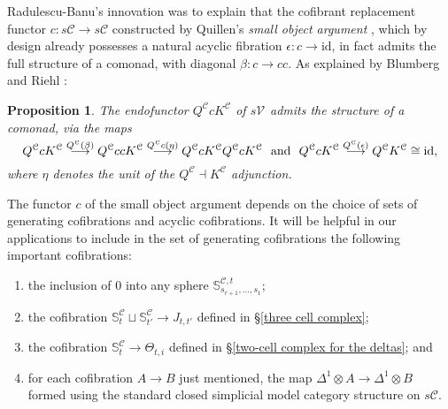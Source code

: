 \documentclass[11pt]{amsart} \renewcommand{\baselinestretch}{1.2}
\theoremstyle{plain}
\newtheorem{prop}[thm]{Proposition}
\numberwithin{equation}{section} %
\theoremstyle{plain}
\newtheorem{prop}[thm]{Proposition}
\numberwithin{equation}{chapter} %
\renewcommand{\to}{\longrightarrow}
\newcommand{\calV}{\mathcal{V}}
\newcommand{\calc}{\mathcal{C}}
\newcommand{\citeBOX}[2][]{\cite[\mbox{#1}]{#2}}
\newcommand{\vect}[2]{\calV^{#1}_{#2}}
\newcommand{\Id}{\mathrm{id}}
\begin{document}
\begin{Pi-algebras and cohomology algebras}
Radulescu-Banu's innovation \cite{Radulescu-Banu.pdf} was to explain that the cofibrant replacement functor $c:s\calc\to s\calc$ constructed by Quillen's \emph{small object argument}  \cite{QuillenHomAlg.pdf}, which by design already possesses a natural acyclic fibration $\epsilon:c\to\Id$, in fact admits the full structure of a comonad, with diagonal $\beta:c\to cc$. As explained by Blumberg and Riehl \cite[Remark 4.12]{BlumRiehlResolutions.pdf}:
\begin{prop}
\label{QcK is a comonad}
The endofunctor $Q^\calc cK^\calc$ of $s\vect{}{}$ admits the structure of a comonad, via the maps
\[Q^\calc cK^\calc\overset{\smash{Q^\calc (\beta)}}{\to}Q^\calc ccK^\calc \overset{\smash{Q^\calc c(\eta)}}{\to} Q^\calc cK^\calc Q^\calc cK^\calc\text{ \ and \ }Q^\calc cK^\calc\overset{\smash{Q^\calc (\epsilon)}}{\to}Q^\calc K^\calc\cong\Id,\]
where $\eta$ denotes the unit of the $Q^\calc\dashv K^\calc$ adjunction.
\end{prop}

The functor $c$ of the small object argument depends on the choice of sets of generating cofibrations and acyclic cofibrations. It will be helpful in our applications to include in the set of generating cofibrations the following important cofibrations:
\begin{enumerate}
\item the inclusion of $0$ into any sphere $\mathbb{S}^{\calc,t}_{s_{r+1},\ldots,s_1}$;
\item the cofibration $\mathbb{S}^{\calc}_t\sqcup \mathbb{S}^{\calc}_{t'}\to J_{t,t'}$  defined in \S\ref{three cell complex};
\item the cofibration 
$\mathbb{S}^{\calc}_t\to\Theta_{t,i}$ defined in \S\ref{two-cell complex for the deltas}; and
\item for each cofibration $A\to B$ just mentioned, the map $\Delta^1\otimes A\to \Delta^1\otimes B$ formed using the standard closed simplicial  model category structure \citeBOX[II.4]{QuillenHomAlg.pdf} on $s\calc$.
\end{enumerate}



\end{Pi-algebras and cohomology algebras}
\end{document}
